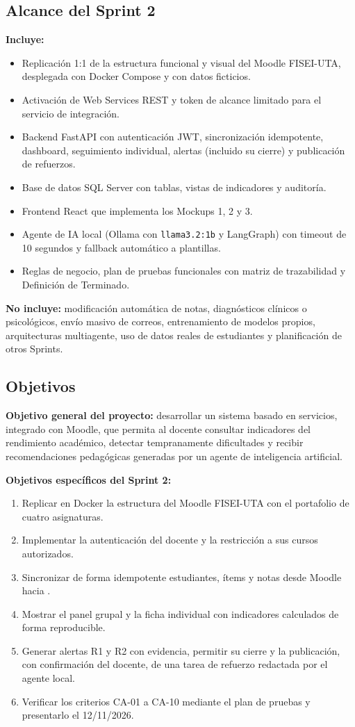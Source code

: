 \documentclass[11pt,a4paper]{article}
\begin{document}
\subsection{Alcance del Sprint 2}
\textbf{Incluye:}
\begin{itemize}
  \item Replicación 1:1 de la estructura funcional y visual del Moodle FISEI-UTA, desplegada con Docker Compose y con datos ficticios.
  \item Activación de Web Services REST y token de alcance limitado para el servicio de integración.
  \item Backend FastAPI con autenticación JWT, sincronización idempotente, dashboard, seguimiento individual, alertas (incluido su cierre) y publicación de refuerzos.
  \item Base de datos SQL Server  con tablas, vistas de indicadores y auditoría.
  \item Frontend React que implementa los Mockups 1, 2 y 3.
  \item Agente de IA local (Ollama con \texttt{llama3.2:1b} y LangGraph) con timeout de 10 segundos y fallback automático a plantillas.
  \item Reglas de negocio, plan de pruebas funcionales con matriz de trazabilidad y Definición de Terminado.
\end{itemize}
\textbf{No incluye:} modificación automática de notas, diagnósticos clínicos o psicológicos, envío masivo de correos, entrenamiento de modelos propios, arquitecturas multiagente, uso de datos reales de estudiantes y planificación de otros Sprints.

\subsection{Objetivos}
\textbf{Objetivo general del proyecto:} desarrollar un sistema basado en servicios, integrado con Moodle, que permita al docente consultar indicadores del rendimiento académico, detectar tempranamente dificultades y recibir recomendaciones pedagógicas generadas por un agente de inteligencia artificial.

\textbf{Objetivos específicos del Sprint 2:}
\begin{enumerate}
  \item Replicar en Docker la estructura del Moodle FISEI-UTA con el portafolio de cuatro asignaturas.
  \item Implementar la autenticación del docente y la restricción a sus cursos autorizados.
  \item Sincronizar de forma idempotente estudiantes, ítems y notas desde Moodle hacia .
  \item Mostrar el panel grupal y la ficha individual con indicadores calculados de forma reproducible.
  \item Generar alertas R1 y R2 con evidencia, permitir su cierre y la publicación, con confirmación del docente, de una tarea de refuerzo redactada por el agente local.
  \item Verificar los criterios CA-01 a CA-10 mediante el plan de pruebas y presentarlo el 12/11/2026.
\end{enumerate}
\end{document}
